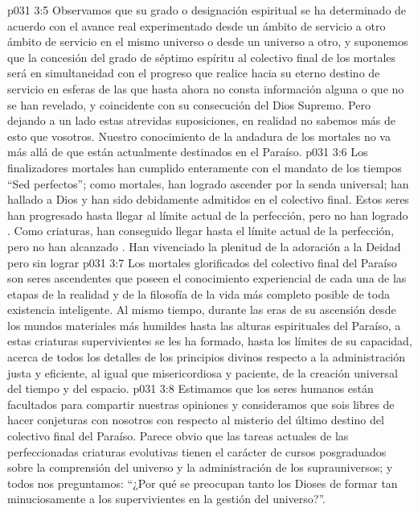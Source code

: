\vs p031 3:5 Observamos que su grado o designación espiritual se ha determinado de acuerdo con el avance real experimentado desde un ámbito de servicio a otro ámbito de servicio en el mismo universo o desde un universo a otro, y suponemos que la concesión del grado de séptimo espíritu al colectivo final de los mortales será en simultaneidad con el progreso que realice hacia su eterno destino de servicio en esferas de las que hasta ahora no consta información alguna o que no se han revelado, y coincidente con su consecución del Dios Supremo. Pero dejando a un lado estas atrevidas suposiciones, en realidad no sabemos más de esto que vosotros. Nuestro conocimiento de la andadura de los mortales no va más allá de que están actualmente destinados en el Paraíso.
\vs p031 3:6 Los finalizadores mortales han cumplido enteramente con el mandato de los tiempos “Sed perfectos”; como mortales, han logrado ascender por la senda universal; han hallado a Dios y han sido debidamente admitidos en el colectivo final. Estos seres han progresado hasta llegar al límite actual de la perfección, pero no han logrado . Como criaturas, han conseguido llegar hasta el límite actual de la perfección, pero no han alcanzado . Han vivenciado la plenitud de la adoración a la Deidad pero sin lograr 
\vs p031 3:7 Los mortales glorificados del colectivo final del Paraíso son seres ascendentes que poseen el conocimiento experiencial de cada una de las etapas de la realidad y de la filosofía de la vida más completo posible de toda existencia inteligente. Al mismo tiempo, durante las eras de su ascensión desde los mundos materiales más humildes hasta las alturas espirituales del Paraíso, a estas criaturas supervivientes se les ha formado, hasta los límites de su capacidad, acerca de todos los detalles de los principios divinos respecto a la administración justa y eficiente, al igual que misericordiosa y paciente, de la creación universal del tiempo y del espacio.
\vs p031 3:8 \pc Estimamos que los seres humanos están facultados para compartir nuestras opiniones y consideramos que sois libres de hacer conjeturas con nosotros con respecto al misterio del último destino del colectivo final del Paraíso. Parece obvio que las tareas actuales de las perfeccionadas criaturas evolutivas tienen el carácter de cursos posgraduados sobre la comprensión del universo y la administración de los suprauniversos; y todos nos preguntamos: “¿Por qué se preocupan tanto los Dioses de formar tan minuciosamente a los supervivientes en la gestión del universo?”.
